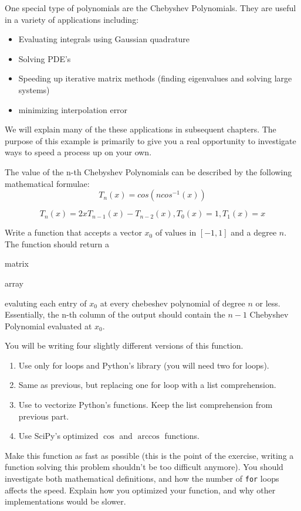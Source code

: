 One special type of polynomials are the Chebyshev Polynomials. They are useful in a variety of applications including:
\begin{itemize}
\item Evaluating integrals using Gaussian quadrature
\item Solving PDE's
\item Speeding up iterative matrix methods (finding eigenvalues and solving large systems)
\item minimizing interpolation error
\end{itemize}

We will explain many of the these applications in subsequent chapters. The purpose of this example is primarily to give you a real opportunity to investigate ways to speed a process up on your own.

The value of the n-th Chebyshev Polynomials can be described by the following mathematical formulae\footnotemark :
\[
T_n(x) = cos(n cos^{-1}(x))
\]

\[
T_n(x) = 2xT_{n-1}(x) - T_{n-2}(x), T_0(x) = 1, T_1(x) = x
\]


\begin{problem}
Write a function that accepts a vector $x_0$ of values in $[-1,1]$ and a degree $n$.  The function should return a \begin{matlab}matrix\end{matlab}\begin{python}array\end{python} evaluting each entry of $x_0$ at every chebeshev polynomial of degree $n$ or less. Essentially, the n-th column of the output should contain the $n-1$ Chebyshev Polynomial evaluated at $x_0$. 
\begin{python}
You will be writing four slightly different versions of this function.
\begin{enumerate}
\item Use only for loops and Python's  library (you will need two for loops).
\item Same as previous, but replacing one for loop with a list comprehension.
\item Use  to vectorize Python's  functions.  Keep the list comprehension from previous part.
\item Use SciPy's optimized $\cos$ and $\arccos$ functions.
\end{enumerate}
\end{python}
Make this function as fast as possible (this is the point of the exercise, writing a function solving this problem shouldn't be too difficult anymore). You should investigate both mathematical definitions, and how the number of {\tt for} loops affects the speed. Explain how you optimized your function, and why other implementations would be slower.
\end{problem}
